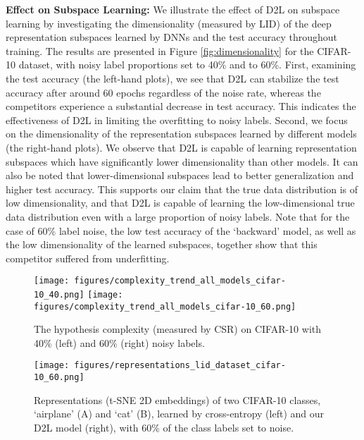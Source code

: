 \documentclass{article}
\begin{document}
\textbf{Effect on Subspace Learning:}
We illustrate the effect of D2L on subspace learning by investigating the dimensionality (measured by LID) of the deep representation subspaces learned by DNNs and the test accuracy throughout training. The results are presented in Figure \ref{fig:dimensionality} for the CIFAR-10 dataset, with noisy label proportions set to 40\% and to 60\%. First, examining the test accuracy (the left-hand plots), we see that D2L can stabilize the test accuracy after around 60 epochs regardless of the noise rate, whereas the competitors experience a substantial decrease in test accuracy. This indicates the effectiveness of D2L in limiting the overfitting to noisy labels. Second, we focus on the dimensionality of the representation subspaces learned by different models (the right-hand plots). We observe that D2L is capable of learning representation subspaces which have significantly lower dimensionality than other models. It can also be noted that lower-dimensional subspaces lead to better generalization and higher test accuracy. This supports our claim that the true data distribution is of low dimensionality, and that D2L is capable of learning the low-dimensional true data distribution even with a large proportion of noisy labels. Note that for the case of 60\% label noise, the low test accuracy of the `backward' model, as well as the low dimensionality of the learned subspaces, together show that this competitor suffered from underfitting.


\begin{figure}[!ht]
\centering
\small
\texttt{[image: figures/complexity\_trend\_all\_models\_cifar-10\_40.png]}
\texttt{[image: figures/complexity\_trend\_all\_models\_cifar-10\_60.png]}
\caption{The hypothesis complexity (measured by CSR) on CIFAR-10 with 40\% (left) and 60\% (right) noisy labels.}
\label{fig:complexity}
\end{figure}

\begin{figure}[!t]
\centering
\small
\texttt{[image: figures/representations\_lid\_dataset\_cifar-10\_60.png]}
\caption{Representations (t-SNE 2D embeddings) of two CIFAR-10 classes, `airplane' (A) and `cat' (B), learned by cross-entropy (left) and our D2L model (right), with 60\% of the class labels set to noise.}
\label{fig:representation}
\vspace{-0.2in}
\end{figure}
\end{document}
